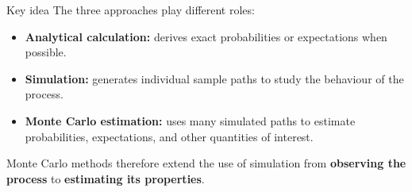\documentclass[
  ignorenonframetext,
  aspectratio=169,
]{beamer}
\providecommand{\tightlist}{%
  \setlength{\itemsep}{0pt}\setlength{\parskip}{0pt}}
\begin{document}
\begin{frame}{Key idea}
\protect{}\label{key-idea-2}
The three approaches play different roles:

\begin{itemize}
\tightlist
\item
  \textbf{Analytical calculation:} derives exact probabilities or
  expectations when possible.
\item
  \textbf{Simulation:} generates individual sample paths to study the
  behaviour of the process.
\item
  \textbf{Monte Carlo estimation:} uses many simulated paths to estimate
  probabilities, expectations, and other quantities of interest.
\end{itemize}

Monte Carlo methods therefore extend the use of simulation from
\textbf{observing the process} to \textbf{estimating its properties}.
\end{frame}
\end{document}
